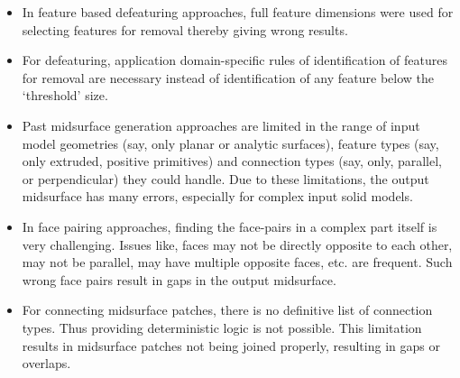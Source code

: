 \begin{itemize}[noitemsep,topsep=2pt,parsep=2pt,partopsep=2pt]%

	\item In feature based defeaturing approaches, full feature dimensions were used for selecting features for removal thereby giving wrong results.
	\item For defeaturing, application domain-specific rules of identification of features for removal are necessary instead of identification of any feature below the `threshold' size.
	\item Past midsurface generation approaches are limited in the range of input model geometries (say, only planar or analytic surfaces), feature types (say, only extruded, positive primitives) and connection types (say, only, parallel, or perpendicular) they could handle. Due to these limitations, the output midsurface has many errors, especially for complex input solid models.
	\item  %
In face pairing approaches, finding the face-pairs in a complex part itself is very challenging. Issues like, faces may not be directly opposite to each other, may not be parallel, may have multiple opposite faces, etc. are frequent. Such wrong face pairs result in gaps in the output midsurface. %
	\item  %
For connecting midsurface patches, there is no definitive list of connection types. Thus providing deterministic logic is not possible. This limitation results in midsurface patches not being joined properly, resulting in gaps or overlaps. %
\end{itemize}
 
 



